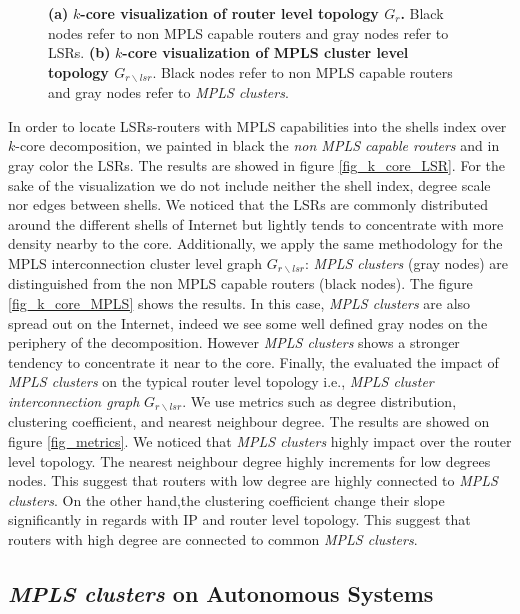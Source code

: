 \begin{figure*}[!t]
\centering
{}
\hfil
{}
\caption{ \textbf{(a)} \textbf{$k$-core visualization of router level topology $G_{r}$.} Black nodes refer to non MPLS capable routers and gray nodes refer to LSRs. \textbf{(b)} \textbf{$k$-core visualization of MPLS cluster level topology  $G_{r\backslash lsr}$}. Black nodes refer to non MPLS capable routers and gray nodes refer to \textit{MPLS clusters}.}
\label{fig_kcore_overview}
\end{figure*}

In order to locate LSRs-routers
with MPLS capabilities into the shells index over $k$-core decomposition, we painted in black the 
\textit{non MPLS capable routers} and in gray color the LSRs. The
results are showed in figure \ref{fig_k_core_LSR}. For the sake of the
visualization we do not include neither the shell index, degree scale nor edges between shells. We noticed
that the LSRs are commonly distributed around the different shells of Internet
but  lightly tends to concentrate with more density nearby to the core.
Additionally, we apply the same methodology for the MPLS interconnection cluster level graph
$G_{r\backslash lsr}$: \textit{MPLS clusters} (gray nodes) are distinguished from the non MPLS capable routers (black nodes). The figure \ref{fig_k_core_MPLS} shows the
results. In this case,  \textit{MPLS clusters}  are also spread out on the Internet, indeed we see some well defined gray nodes on the periphery of the decomposition. However \textit{MPLS clusters} shows a stronger tendency to
concentrate it near to the core. Finally, the evaluated the impact of \textit{MPLS clusters} on the typical router level topology i.e., \textit{MPLS cluster interconnection graph} $G_{r \backslash lsr }$. We use metrics such as degree distribution, clustering coefficient, and nearest neighbour degree. The results are showed on figure \ref{fig_metrics}. We noticed that \textit{MPLS clusters} highly impact over the router level topology. The nearest neighbour degree highly increments for low degrees nodes. This suggest that routers with low degree are highly connected to \textit{MPLS clusters}. On the other hand,the clustering coefficient change their slope significantly in regards with IP and router level topology. This suggest that routers with high degree are connected to common \textit{MPLS clusters}.


\subsection{\textit{MPLS clusters} on Autonomous Systems}\label{cluster.as}

